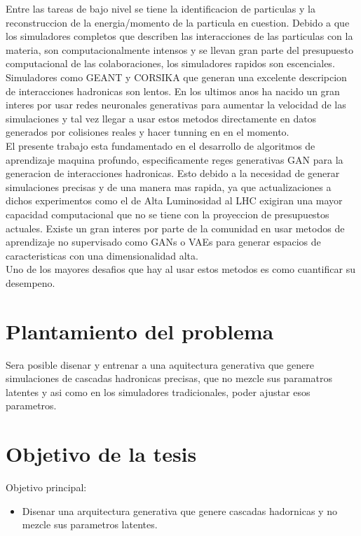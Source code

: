 Entre las tareas de bajo nivel se tiene la identificacion de particulas y la reconstruccion de la energia/momento de la particula en cuestion.
Debido a que los simuladores completos que describen las interacciones de las particulas con la materia, son computacionalmente intensos
y se llevan gran parte del presupuesto computacional de las colaboraciones, los simuladores rapidos son escenciales.
Simuladores como GEANT y CORSIKA que generan una excelente descripcion de interacciones hadronicas son lentos.
En los ultimos anos ha nacido un gran interes por usar redes neuronales generativas para aumentar la velocidad de las simulaciones y tal vez
llegar a usar estos metodos directamente en datos generados por colisiones reales y hacer tunning en en el momento.\\

El presente trabajo esta fundamentado en el desarrollo de algoritmos de aprendizaje maquina profundo, especificamente reges generativas GAN 
para la generacion de interacciones hadronicas. Esto debido a la necesidad de generar simulaciones precisas y de una manera mas rapida,
ya que actualizaciones a dichos experimentos como el de Alta Luminosidad al LHC exigiran una mayor capacidad computacional que no se tiene con la proyeccion de presupuestos actuales.
Existe un gran interes por parte de la comunidad en usar metodos de aprendizaje no supervisado como GANs o VAEs para generar espacios de caracteristicas con una dimensionalidad alta.\\
Uno de los mayores desafios que hay al usar estos metodos es como cuantificar su desempeno.

\section{Plantamiento del problema}


Sera posible disenar y entrenar a una aquitectura generativa que genere simulaciones de cascadas hadronicas precisas, que no mezcle
sus paramatros latentes y asi como en los simuladores tradicionales, poder ajustar esos parametros.


\section{Objetivo de la tesis}
Objetivo principal:
\begin{itemize}
    \item Disenar una arquitectura generativa que genere cascadas hadornicas y no mezcle sus parametros latentes.
\end{itemize}

